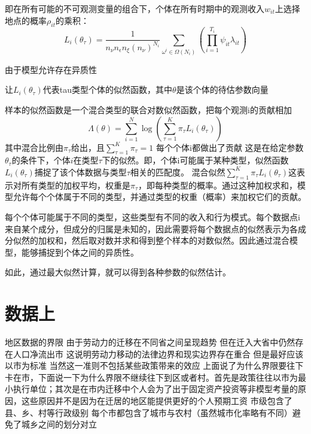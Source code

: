 \documentclass[a4paper,12pt,oneside, fontset=mac]{ctexbook} %
\begin{document}
即在所有可能的不可观测变量的组合下，个体在所有时期中的观测收入$w_{it}$上选择地点的概率$\rho_{it}$的乘积：
\begin{equation}
  L_{i}(\theta_{\tau})=\frac{1}{n_{\nu}n_{\epsilon}n_{\xi}(n_{\nu})^{N_{i}}} \sum\limits_{\omega^{i}\in\Omega(N_{i})}(\prod\limits_{i=1}^{T_{i}} \psi_{it}\lambda_{it})
\end{equation}

由于模型允许存在异质性

让$L_{i}(\theta_{\tau})$代表tau类型个体的似然函数，其中$\theta$是该个体的待估参数向量

样本的似然函数是一个混合类型的联合对数似然函数，把每个观测i的贡献相加
\begin{equation}
\Lambda(\theta)=\sum\limits_{i=1}^{N}\log(\sum\limits_{\tau=1}^{K}\pi_{\tau}L_{i}(\theta_{\tau})) 
\end{equation}
其中混合比例由$\pi_{\tau}$给出，且$\sum\limits_{\tau=1}^{K}\pi_{\tau}=1$
每个个体i都做出了贡献
这是在给定参数$\theta_{\tau}$的条件下，个体$i$在类型$\tau$下的似然。即，个体i可能属于某种类型，似然函数
$L_i(\theta_{\tau})$捕捉了该个体数据与类型$\tau$相关的匹配度。
混合似然$\sum_{\tau=1}^{K} \pi_{\tau} L_i(\theta_{\tau})$这表示对所有类型的加权平均，权重是$\pi_{\tau}$，即每种类型的概率。通过这种加权求和，模型允许每个个体属于不同的类型，并通过类型的权重（概率）来加权它们的贡献。

每个个体可能属于不同的类型，这些类型有不同的收入和行为模式。每个数据点i来自某个成分，但成分的归属是未知的，因此需要将每个数据点的似然表示为各成分似然的加权和，然后取对数并求和得到整个样本的对数似然。因此通过混合模型，能够捕捉到个体之间的异质性。


如此，通过最大似然计算，就可以得到各种参数的似然估计。




\section{数据上}

地区数据的界限
由于劳动力的迁移在不同省之间呈现趋势 但在迁入大省中仍然存在人口净流出市 这说明劳动力移动的法律边界和现实边界存在重合 但是最好应该以市为标准 当然这一准则不包括某些政策带来的效应
上面说了为什么界限要往下卡在市，下面说一下为什么界限不继续往下到区或者村。首先是政策往往以市为最小执行单位；其次是在市内迁移中个人会为了出于固定资产投资等非模型考量的原因，这些原因并不是因为在迁居的地区能提供更好的个人预期工资
市级包含了县、乡、村等行政级别 每个市都包含了城市与农村（虽然城市化率略有不同）避免了城乡之间的划分对立
\end{document}
